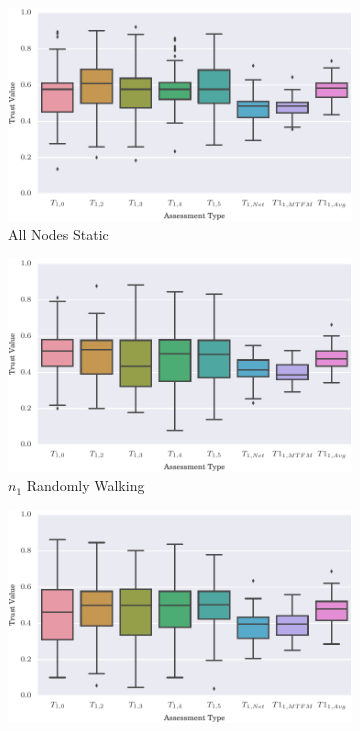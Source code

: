 \documentclass[runningheads,a4paper]{llncs}
\begin{document}
{{\begin{figure}
\begin{subfigure}{.5\textwidth}
  \centering
  \includegraphics[width=.8\linewidth]{img/trust_bella_static_selfish.pdf}
  \caption{All Nodes Static}
  \label{fig:trust_static}
\end{subfigure}%
\begin{subfigure}{.5\textwidth}
  \centering
  \includegraphics[width=.8\linewidth]{img/trust_bella_single_mobile_selfish.pdf}
  \caption{$n_1$ Randomly Walking}
  \label{fig:trust_single}
\end{subfigure}
\begin{subfigure}{.5\textwidth}
\centering
  \includegraphics[width=.8\linewidth]{img/trust_bella_allbut1_mobile_selfish.pdf}

\end{subfigure}
\end{figure}}}
\end{document}

